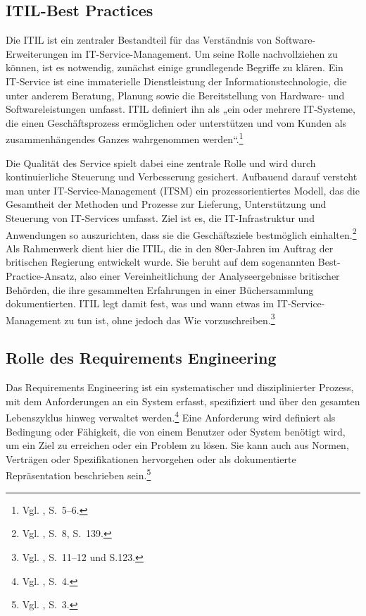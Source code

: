 \documentclass[
    12pt, 
    a4paper,
    ]{scrartcl} %
\begin{document}
\subsection{ITIL-Best Practices}

Die ITIL ist ein zentraler Bestandteil für das Verständnis von Software-Erweiterungen im IT-Service-Management. Um seine Rolle nachvollziehen zu können, ist es notwendig, zunächst einige grundlegende Begriffe zu klären. Ein IT-Service ist eine immaterielle Dienstleistung der Informationstechnologie, die unter anderem Beratung, Planung sowie die Bereitstellung von Hardware- und Softwareleistungen umfasst. ITIL definiert ihn als „ein oder mehrere IT-Systeme, die einen Geschäftsprozess ermöglichen oder unterstützen und vom Kunden als zusammenhängendes Ganzes wahrgenommen werden“.\footnote{Vgl. \cite{S_ITIL}, S.~5--6.} 

Die Qualität des Service spielt dabei eine zentrale Rolle und wird durch kontinuierliche Steuerung und Verbesserung gesichert. Aufbauend darauf versteht man unter IT-Service-Management (ITSM) ein prozessorientiertes Modell, das die Gesamtheit der Methoden und Prozesse zur Lieferung, Unterstützung und Steuerung von IT-Services umfasst. Ziel ist es, die IT-Infrastruktur und Anwendungen so auszurichten, dass sie die Geschäftsziele bestmöglich einhalten.\footnote{Vgl. \cite{S_ITIL}, S.~8, S.~139.} Als Rahmenwerk dient hier die ITIL, die in den 80er-Jahren im Auftrag der britischen Regierung entwickelt wurde. Sie beruht auf dem sogenannten Best-Practice-Ansatz, also einer Vereinheitlichung der Analyseergebnisse britischer Behörden, die ihre gesammelten Erfahrungen in einer Büchersammlung dokumentierten. ITIL legt damit fest, was und wann etwas im IT-Service-Management zu tun ist, ohne jedoch das Wie vorzuschreiben.\footnote{Vgl. \cite{S_ITIL}, S.~11--12 und S.123.}

\subsection{Rolle des Requirements Engineering}

Das Requirements Engineering ist ein systematischer und disziplinierter Prozess, mit dem Anforderungen an ein System erfasst, spezifiziert und über den gesamten Lebenszyklus hinweg verwaltet werden.\footnote{Vgl. \cite{S_PohlRupp}, S.~4.} Eine Anforderung wird definiert als Bedingung oder Fähigkeit, die von einem Benutzer oder System benötigt wird, um ein Ziel zu erreichen oder ein Problem zu lösen. Sie kann auch aus Normen, Verträgen oder Spezifikationen hervorgehen oder als dokumentierte Repräsentation beschrieben sein.\footnote{Vgl. \cite{S_PohlRupp}, S.~3.}
\end{document}
